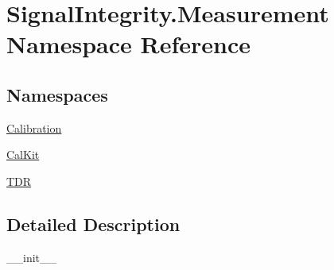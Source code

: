 \hypertarget{namespaceSignalIntegrity_1_1Measurement}{}\section{Signal\+Integrity.\+Measurement Namespace Reference}
\label{namespaceSignalIntegrity_1_1Measurement}
\subsection*{Namespaces}
\begin{DoxyCompactItemize}
\item 
 \hyperlink{namespaceSignalIntegrity_1_1Measurement_1_1Calibration}{Calibration}
\item 
 \hyperlink{namespaceSignalIntegrity_1_1Measurement_1_1CalKit}{Cal\+Kit}
\item 
 \hyperlink{namespaceSignalIntegrity_1_1Measurement_1_1TDR}{T\+DR}
\end{DoxyCompactItemize}


\subsection{Detailed Description}
\begin{DoxyVerb}__init__\end{DoxyVerb}
 